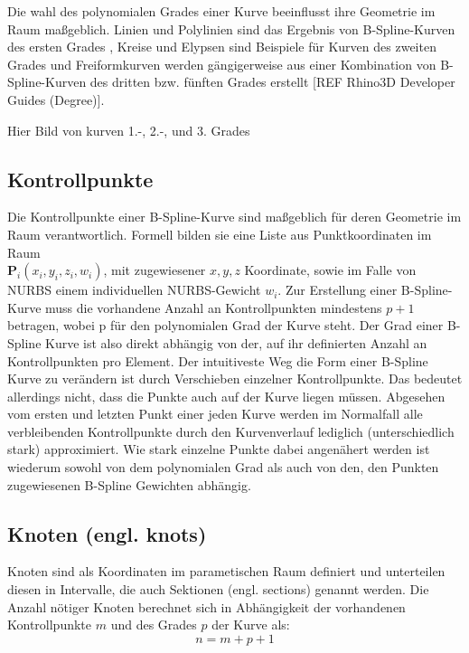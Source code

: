 \documentclass[german,a4paper,12pt,oneside]{scrbook}
\theoremstyle{definition}
\theoremstyle{definition}
\theoremstyle{definition}
\theoremstyle{definition}
\theoremstyle{definition}
\theoremstyle{definition}
\begin{document}
Die wahl des polynomialen Grades einer Kurve beeinflusst ihre Geometrie im Raum maßgeblich. Linien und Polylinien sind das Ergebnis von B-Spline-Kurven des ersten Grades , Kreise und Elypsen sind Beispiele für Kurven des zweiten Grades und Freiformkurven werden gängigerweise aus einer Kombination von B-Spline-Kurven des dritten bzw. fünften Grades erstellt [REF Rhino3D Developer Guides (Degree)].

\large
\vspace{1.5cm}
\hfil
Hier Bild von kurven 1.-, 2.-, und 3. Grades

\normalsize
\subsection{Kontrollpunkte}
Die Kontrollpunkte einer B-Spline-Kurve sind maßgeblich für deren Geometrie im Raum verantwortlich. Formell bilden sie eine Liste aus Punktkoordinaten im Raum \\ $\bm{P}_i(x_i, y_i, z_i, w_i)$, mit zugewiesener $x, y, z$ Koordinate, sowie im Falle von NURBS einem individuellen NURBS-Gewicht $w_i$. Zur Erstellung einer B-Spline-Kurve muss die vorhandene Anzahl an Kontrollpunkten mindestens $p+1$ betragen, wobei p für den polynomialen Grad der Kurve steht. Der Grad einer B-Spline Kurve ist also direkt abhängig von der, auf ihr definierten Anzahl an Kontrollpunkten pro Element. Der intuitiveste Weg die Form einer B-Spline Kurve zu verändern ist durch Verschieben einzelner Kontrollpunkte. Das bedeutet allerdings nicht, dass die Punkte auch auf der Kurve liegen müssen. Abgesehen vom ersten und letzten Punkt einer jeden Kurve werden im Normalfall alle verbleibenden Kontrollpunkte durch den Kurvenverlauf lediglich (unterschiedlich stark) approximiert. Wie stark einzelne Punkte dabei angenähert werden ist wiederum sowohl von dem polynomialen Grad als auch von den, den Punkten zugewiesenen B-Spline Gewichten abhängig.

\subsection{Knoten (engl. knots)}
\label{subsec: Knoten}
Knoten sind als Koordinaten im parametischen Raum definiert und unterteilen diesen in Intervalle, die auch Sektionen (engl. sections) genannt werden. Die Anzahl nötiger Knoten berechnet sich in Abhängigkeit der vorhandenen Kontrollpunkte $m$ und des Grades $p$ der Kurve als: 
\begin{equation*}
        n = m + p + 1
\end{equation*}
\end{document}
